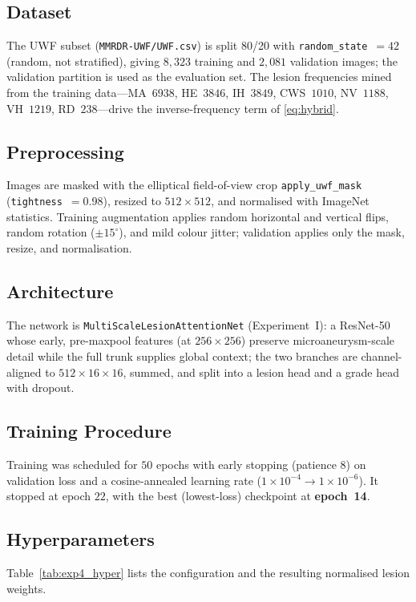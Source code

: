\documentclass[journal,twoside,web]{ieeecolor}
\begin{document}
\subsection{Dataset}
The UWF subset (\texttt{MMRDR-UWF/UWF.csv}) is split 80/20 with
\texttt{random\_state}~$=42$ (random, not stratified), giving $8{,}323$ training and
$2{,}081$ validation images; the validation partition is used as the evaluation set.
The lesion frequencies mined from the training data---MA~$6938$, HE~$3846$,
IH~$3849$, CWS~$1010$, NV~$1188$, VH~$1219$, RD~$238$---drive the inverse-frequency
term of \eqref{eq:hybrid}.

\subsection{Preprocessing}
Images are masked with the elliptical field-of-view crop \texttt{apply\_uwf\_mask}
(\texttt{tightness}~$=0.98$), resized to $512\times512$, and normalised with
ImageNet statistics. Training augmentation applies random horizontal and vertical
flips, random rotation ($\pm15^{\circ}$), and mild colour jitter; validation applies
only the mask, resize, and normalisation.

\subsection{Architecture}
The network is \texttt{MultiScaleLesionAttentionNet} (Experiment~I): a ResNet-50
whose early, pre-maxpool features (at $256\times256$) preserve microaneurysm-scale
detail while the full trunk supplies global context; the two branches are
channel-aligned to $512\times16\times16$, summed, and split into a lesion head and a
grade head with dropout.

\subsection{Training Procedure}
Training was scheduled for $50$ epochs with early stopping (patience $8$) on
validation loss and a cosine-annealed learning rate
($1\times10^{-4}\!\rightarrow\!1\times10^{-6}$). It stopped at epoch $22$, with the
best (lowest-loss) checkpoint at \textbf{epoch~14}.

\subsection{Hyperparameters}
Table~\ref{tab:exp4_hyper} lists the configuration and the resulting normalised
lesion weights.
\end{document}
